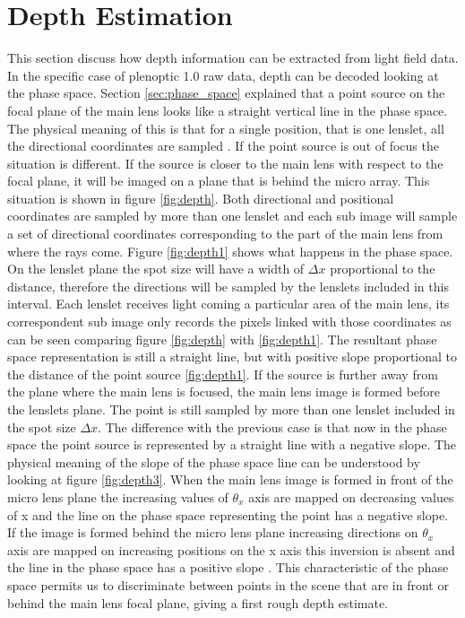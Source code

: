  \section{Depth Estimation}
 \label{sec:depth10}
 This section discuss how depth information can be extracted from light field data. In the specific case of plenoptic 1.0 raw data, depth can be decoded looking at the phase space. Section \ref{sec:phase_space} explained that a point source on the focal plane of the main lens looks like a straight vertical line in the phase space. The physical meaning of this is that for a single position, that is one lenslet, all the directional coordinates are sampled \cite{georgiev2010focused}. If the point source is out of focus the situation is different. If the source is closer to the main lens with respect to the focal plane, it will be imaged on a plane that is behind the micro array. This situation is shown in figure \ref{fig:depth}. Both directional and positional coordinates are sampled by more than one lenslet and each sub image will sample a set of directional coordinates corresponding to the part of the main lens from where the rays come. Figure \ref{fig:depth1} shows what happens in the phase space. On the lenslet plane the spot size will have a width of $\Delta x$ proportional to the distance, therefore the directions will be sampled by the lenslets included in this interval. Each lenslet receives light coming  a particular area of the main lens, its correspondent sub image only records the pixels linked with those coordinates as can be seen comparing figure \ref{fig:depth} with \ref{fig:depth1}. The resultant phase space representation is still a straight line, but with positive slope proportional to the distance of the point source \ref{fig:depth1}. If the source is further away from the plane where the main lens is focused, the main lens image is formed before the lenslets plane. The point is still sampled by more than one lenslet included in the spot size $\Delta x$. The difference with the previous case is that now in the phase space the point source is represented by a straight line with a negative slope. The physical meaning of the slope of the phase space line can be understood by looking at figure \ref{fig:depth3}. When the main lens image is formed in front of the micro lens plane the increasing values of $\theta_x$ axis are mapped on decreasing values of x and the line on the phase space representing the point has a negative slope. If the image is formed behind the micro lens plane increasing directions on $\theta_x$ axis are mapped on increasing positions on the x axis this inversion is absent and the line in the phase space has a positive slope \cite{ng2006digital}. This characteristic of the phase space permits us to discriminate between points in the scene that are in front or behind the main lens focal plane, giving a first rough depth estimate. 
